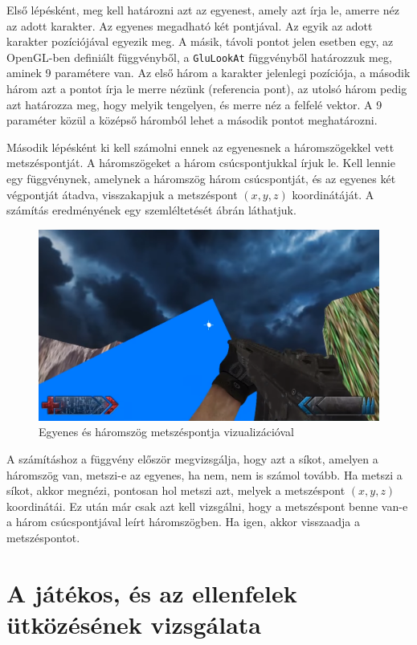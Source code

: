 Első lépésként, meg kell határozni azt az egyenest, amely azt írja le, amerre néz az adott karakter. Az egyenes megadható két pontjával. Az egyik az adott karakter pozíciójával egyezik meg. A másik, távoli pontot jelen esetben egy, az OpenGL-ben definiált függvényből, a \texttt{GluLookAt} függvényből határozzuk meg, aminek 9 paramétere van. Az első három a karakter jelenlegi pozíciója, a második három azt a pontot írja le merre nézünk (referencia pont), az utolsó három pedig azt határozza meg, hogy melyik tengelyen, és merre néz a felfelé vektor. A 9 paraméter közül a középső háromból lehet a második pontot  meghatározni.

Második lépésként ki kell számolni ennek az egyenesnek a háromszögekkel vett metszéspontját. A háromszögeket a három csúcspontjukkal írjuk le. Kell lennie egy függvénynek, amelynek a háromszög három csúcspontját, és az egyenes két végpontját átadva, visszakapjuk a metszéspont $(x, y, z)$ koordinátáját. A számítás eredményének egy szemléltetését  ábrán láthatjuk.

\begin{figure}[h]
\centering
\includegraphics[scale=0.46]{kepek/one_triangle.png}
\caption{Egyenes és háromszög metszéspontja vizualizációval}
\label{fig:triangle}
\end{figure}

A számításhoz a függvény először megvizsgálja, hogy azt a síkot, amelyen a háromszög van, metszi-e az egyenes, ha nem, nem is számol tovább. Ha metszi a síkot, akkor megnézi, pontosan hol metszi azt, melyek a metszéspont $(x, y, z)$ koordinátái. Ez után már csak azt kell vizsgálni, hogy a metszéspont benne van-e a három csúcspontjával leírt háromszögben. Ha igen, akkor visszaadja a metszéspontot.

\section{A játékos, és az ellenfelek ütközésének vizsgálata}

